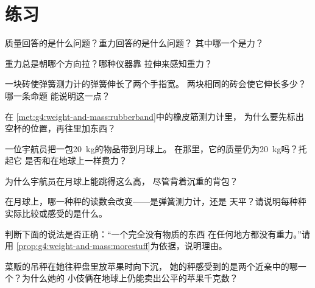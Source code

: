 \section{练习}

\begin{exercise}[$\star$]\label{exo:g4:weight-and-mass:1}
质量回答的是什么问题？重力回答的是什么问题？
其中哪一个是力？
\end{exercise}

\begin{exercise}[$\star$]\label{exo:g4:weight-and-mass:2}
重力总是朝哪个方向拉？哪种仪器靠
拉伸来感知重力？
\end{exercise}

\begin{exercise}[$\star$]\label{exo:g4:weight-and-mass:3}
一块砖使弹簧测力计的弹簧伸长了两个手指宽。
两块相同的砖会使它伸长多少？哪一条命题
能说明这一点？
\end{exercise}

\begin{exercise}[$\star$]\label{exo:g4:weight-and-mass:4}
在
\cref{met:g4:weight-and-mass:rubberband}中的橡皮筋测力计里，
为什么要先标出空杯的位置，再往里加东西？
\end{exercise}

\begin{exercise}[$\star$]\label{exo:g4:weight-and-mass:5}
一位宇航员把一包\qty{20}{kg}的物品带到月球上。
在那里，它的质量仍为\qty{20}{kg}吗？托起它
是否和在地球上一样费力？
\end{exercise}

\begin{exercise}[$\star$]\label{exo:g4:weight-and-mass:6}
为什么宇航员在月球上能跳得这么高，
尽管背着沉重的背包？
\end{exercise}

\begin{exercise}[$\star$]\label{exo:g4:weight-and-mass:7}
在月球上，哪一种秤的读数会改变——是弹簧测力计，还是
天平？请说明每种秤实际比较或感受的是什么。
\end{exercise}

\begin{exercise}[$\star$]\label{exo:g4:weight-and-mass:8}
判断下面的说法是否正确：“一个完全没有物质的东西
在任何地方都没有重力。”请用
\cref{prop:g4:weight-and-mass:morestuff}为依据，说明理由。
\end{exercise}

\begin{exercise}[$\star$]\label{exo:g4:weight-and-mass:9}
菜贩的吊秤在她往秤盘里放苹果时向下沉，
她的秤感受到的是两个近亲中的哪一个？为什么她的
小伎俩在地球上仍能卖出公平的苹果千克数？
\end{exercise}

